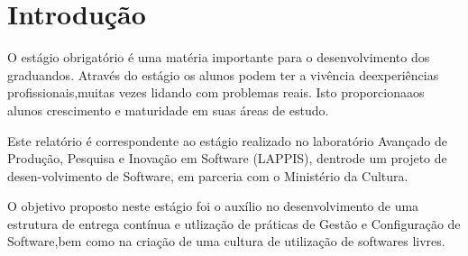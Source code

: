 \chapter[Introdução]{Introdução}

O estágio obrigatório é uma matéria importante para o desenvolvimento dos graduandos. Através do estágio os alunos podem ter a vivência deexperiências profissionais,muitas vezes lidando com problemas reais. Isto proporcionaaos alunos crescimento e maturidade em suas áreas de estudo.

Este relatório é correspondente ao estágio realizado no laboratório Avançado de Produção, Pesquisa e Inovação em Software (LAPPIS), dentrode um projeto de desen-volvimento de Software, em parceria com o Ministério da Cultura.

O objetivo proposto neste estágio foi o auxílio no desenvolvimento de uma estrutura de entrega contínua e utlização de práticas de Gestão e Configuração de Software,bem como na criação de uma cultura de utilização de softwares livres.

